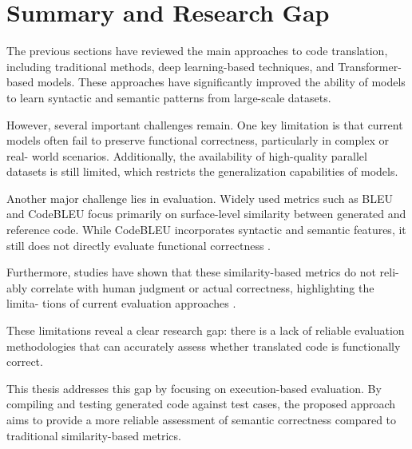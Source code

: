 \section{Summary and Research Gap}

The previous sections have reviewed the main approaches to code translation,
including traditional methods, deep learning-based techniques, and Transformer-
based models. These approaches have significantly improved the ability of models
to learn syntactic and semantic patterns from large-scale datasets.

However, several important challenges remain. One key limitation is that current
models often fail to preserve functional correctness, particularly in complex or real-
world scenarios. Additionally, the availability of high-quality parallel datasets is still
limited, which restricts the generalization capabilities of models.

Another major challenge lies in evaluation. Widely used metrics such as BLEU
and CodeBLEU focus primarily on surface-level similarity between generated
and reference code. While CodeBLEU incorporates syntactic and semantic features, it still does not directly evaluate functional correctness \cite{ren2020codebleu}.

Furthermore, studies have shown that these similarity-based metrics do not reli-
ably correlate with human judgment or actual correctness, highlighting the limita-
tions of current evaluation approaches \cite{evtikhiev2022bleu}.

These limitations reveal a clear research gap: there is a lack of reliable evaluation
methodologies that can accurately assess whether translated code is functionally
correct.

This thesis addresses this gap by focusing on execution-based evaluation. By
compiling and testing generated code against test cases, the proposed approach
aims to provide a more reliable assessment of semantic correctness compared to
traditional similarity-based metrics.

